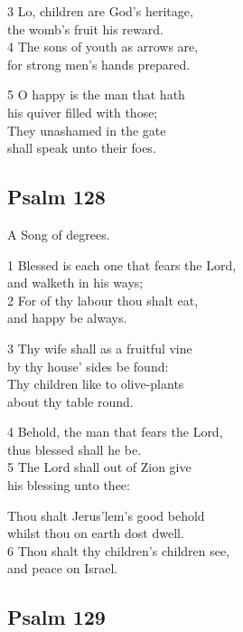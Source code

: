 3 Lo, children are God’s heritage,\\
the womb’s fruit his reward.\\
4 The sons of youth as arrows are,\\
for strong men’s hands prepared.

5 O happy is the man that hath\\
his quiver filled with those;\\
They unashamed in the gate\\
shall speak unto their foes.

\begin{center}
\quad{}\quad{}
\end{center}

\subsection*{Psalm 128}

A Song of degrees.

1 Blessed is each one that fears the Lord,\\
and walketh in his ways;\\
2 For of thy labour thou shalt eat,\\
and happy be always.

3 Thy wife shall as a fruitful vine\\
by thy house’ sides be found:\\
Thy children like to olive-plants\\
about thy table round.

4 Behold, the man that fears the Lord,\\
thus blessed shall he be.\\
5 The Lord shall out of Zion give\\
his blessing unto thee:

Thou shalt Jerus’lem’s good behold\\
whilst thou on earth dost dwell.\\
6 Thou shalt thy children’s children see,\\
and peace on Israel.

\begin{center}
\quad{}\quad{}
\end{center}

\subsection*{Psalm 129}


